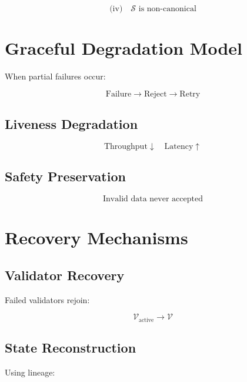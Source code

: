 \begin{equation}
\text{(iv)} \quad \mathcal{S} \text{ is non-canonical}
\end{equation}

\section{Graceful Degradation Model}

When partial failures occur:

\begin{equation}
\text{Failure} \rightarrow \text{Reject} \rightarrow \text{Retry}
\end{equation}

\subsection{Liveness Degradation}

\begin{equation}
\text{Throughput} \downarrow \quad \text{Latency} \uparrow
\end{equation}

\subsection{Safety Preservation}

\begin{equation}
\text{Invalid data never accepted}
\end{equation}

\section{Recovery Mechanisms}

\subsection{Validator Recovery}

Failed validators rejoin:

\begin{equation}
\mathcal{V}_{\text{active}} \rightarrow \mathcal{V}
\end{equation}

\subsection{State Reconstruction}

Using lineage:

